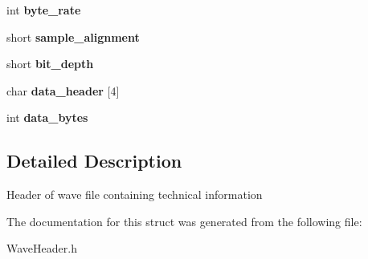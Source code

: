 \begin{DoxyCompactItemize}
int {\bfseries byte\+\_\+rate}
\item 
\mbox{\label{structwav__header_a2672b73c81973008677db6349fbc232a}} 
short {\bfseries sample\+\_\+alignment}
\item 
\mbox{\label{structwav__header_a63fa60069060bae97c8a64c5b37afa23}} 
short {\bfseries bit\+\_\+depth}
\item 
\mbox{\label{structwav__header_ae43fac12459053e98a80e3879c5cd2a7}} 
char {\bfseries data\+\_\+header} \mbox{[}4\mbox{]}
\item 
\mbox{\label{structwav__header_a3eeeca270947eab7c7aaee61bbee9b0e}} 
int {\bfseries data\+\_\+bytes}
\end{DoxyCompactItemize}


\subsection{Detailed Description}
Header of wave file containing technical information 

The documentation for this struct was generated from the following file\+:\begin{DoxyCompactItemize}
\item 
Wave\+Header.\+h\end{DoxyCompactItemize}
